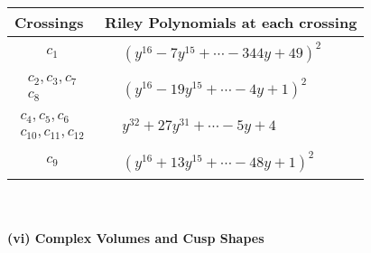 \documentclass[1p]{elsarticle_modified}
\theoremstyle{definition}
\begin{document}
\begin{tabular}{m{50pt}|m{274pt}}
Crossings & \hspace{64pt}Riley Polynomials at each crossing \\
\hline $$\begin{aligned}c_{1}\end{aligned}$$&$\begin{aligned}
&(y^{16}-7 y^{15}+\cdots-344 y+49)^{2}
\end{aligned}$\\
\hline $$\begin{aligned}c_{2},c_{3},c_{7}\\c_{8}\end{aligned}$$&$\begin{aligned}
&(y^{16}-19 y^{15}+\cdots-4 y+1)^{2}
\end{aligned}$\\
\hline $$\begin{aligned}c_{4},c_{5},c_{6}\\c_{10},c_{11},c_{12}\end{aligned}$$&$\begin{aligned}
&y^{32}+27 y^{31}+\cdots-5 y+4
\end{aligned}$\\
\hline $$\begin{aligned}c_{9}\end{aligned}$$&$\begin{aligned}
&(y^{16}+13 y^{15}+\cdots-48 y+1)^{2}
\end{aligned}$\\
\hline
\end{tabular}\\~\\
\newpage\flushleft \textbf{(vi) Complex Volumes and Cusp Shapes}
\end{document}

